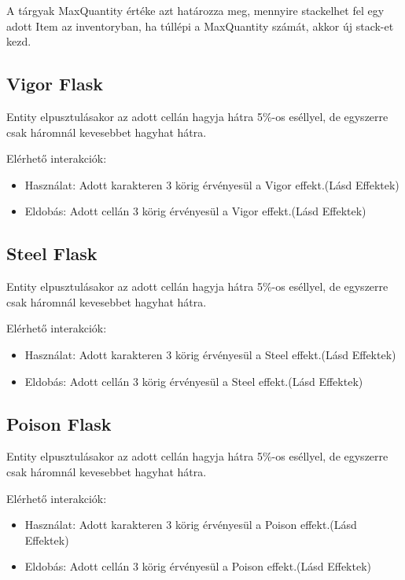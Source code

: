 A tárgyak MaxQuantity értéke azt határozza meg, mennyire stackelhet fel egy adott Item az inventoryban, ha túllépi a MaxQuantity számát, akkor új stack-et kezd.


\subsection{Vigor Flask}

Entity elpusztulásakor az adott cellán hagyja hátra 5\%-os eséllyel, de egyszerre csak háromnál kevesebbet hagyhat hátra.

\noindent Elérhető interakciók:
\begin{itemize}
    \item Használat: Adott karakteren 3 körig érvényesül a Vigor effekt.(Lásd Effektek)
    \item Eldobás: Adott cellán 3 körig érvényesül a Vigor effekt.(Lásd Effektek)
\end{itemize}

\subsection{Steel Flask}

Entity elpusztulásakor az adott cellán hagyja hátra 5\%-os eséllyel, de egyszerre csak háromnál kevesebbet hagyhat hátra.

\noindent Elérhető interakciók:
\begin{itemize}
    \item Használat: Adott karakteren 3 körig érvényesül a Steel effekt.(Lásd Effektek)
    \item Eldobás: Adott cellán 3 körig érvényesül a Steel effekt.(Lásd Effektek)
\end{itemize}

\subsection{Poison Flask}

Entity elpusztulásakor az adott cellán hagyja hátra 5\%-os eséllyel, de egyszerre csak háromnál kevesebbet hagyhat hátra.

\noindent Elérhető interakciók:
\begin{itemize}
    \item Használat: Adott karakteren 3 körig érvényesül a Poison effekt.(Lásd Effektek)
    \item Eldobás: Adott cellán 3 körig érvényesül a Poison effekt.(Lásd Effektek)
\end{itemize}

